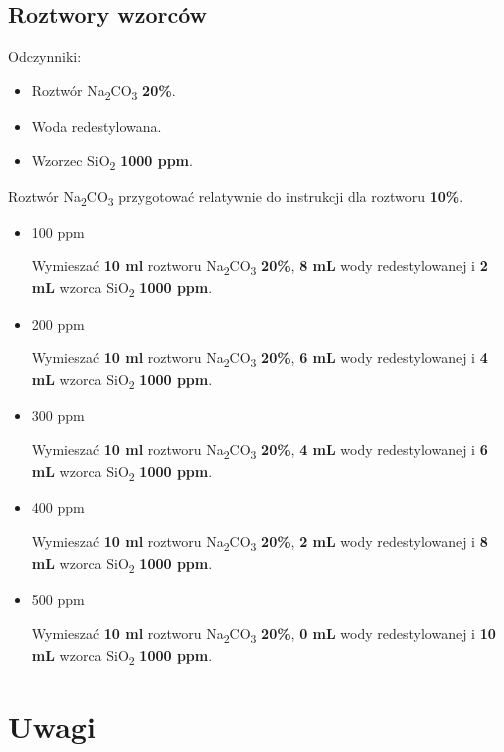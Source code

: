 \documentclass[
  letterpaper,
  DIV=11,
  numbers=noendperiod]{scrreprt}
\providecommand{\tightlist}{%
  \setlength{\itemsep}{0pt}\setlength{\parskip}{0pt}}\usepackage{longtable,booktabs,array}
\begin{document}
\hypertarget{roztwory-wzorcuxf3w}{%
\section{Roztwory wzorców}\label{roztwory-wzorcuxf3w}}

Odczynniki:

\begin{itemize}
\tightlist
\item
  Roztwór Na\textsubscript{2}CO\textsubscript{3} \textbf{20\%}.
\item
  Woda redestylowana.
\item
  Wzorzec SiO\textsubscript{2} \textbf{1000 ppm}.
\end{itemize}

Roztwór Na\textsubscript{2}CO\textsubscript{3} przygotować relatywnie do
instrukcji dla roztworu \textbf{10\%}.

\begin{itemize}
\item
  100 ppm

  Wymieszać \textbf{10 ml} roztworu
  Na\textsubscript{2}CO\textsubscript{3} \textbf{20\%}, \textbf{8 mL}
  wody redestylowanej i \textbf{2 mL} wzorca SiO\textsubscript{2}
  \textbf{1000 ppm}.
\item
  200 ppm

  Wymieszać \textbf{10 ml} roztworu
  Na\textsubscript{2}CO\textsubscript{3} \textbf{20\%}, \textbf{6 mL}
  wody redestylowanej i \textbf{4 mL} wzorca SiO\textsubscript{2}
  \textbf{1000 ppm}.
\item
  300 ppm

  Wymieszać \textbf{10 ml} roztworu
  Na\textsubscript{2}CO\textsubscript{3} \textbf{20\%}, \textbf{4 mL}
  wody redestylowanej i \textbf{6 mL} wzorca SiO\textsubscript{2}
  \textbf{1000 ppm}.
\item
  400 ppm

  Wymieszać \textbf{10 ml} roztworu
  Na\textsubscript{2}CO\textsubscript{3} \textbf{20\%}, \textbf{2 mL}
  wody redestylowanej i \textbf{8 mL} wzorca SiO\textsubscript{2}
  \textbf{1000 ppm}.
\item
  500 ppm

  Wymieszać \textbf{10 ml} roztworu
  Na\textsubscript{2}CO\textsubscript{3} \textbf{20\%}, \textbf{0 mL}
  wody redestylowanej i \textbf{10 mL} wzorca SiO\textsubscript{2}
  \textbf{1000 ppm}.
\end{itemize}

\hypertarget{uwagi}{%
\chapter{Uwagi}\label{uwagi}}
\end{document}
